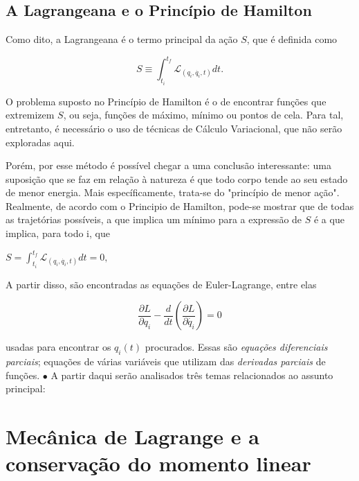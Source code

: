 \documentclass{article}
\begin{document}
\subsection{A Lagrangeana e o Princípio de Hamilton}

Como dito, a Lagrangeana é o termo principal da ação $S$, que é definida como

\begin{equation}
    S \equiv \int_{t_i}^{t_f}  \mathcal{L}_{(q_i,\dot{q_i},t)} dt .
\end{equation}

O problema suposto no Princípio de Hamilton é o de encontrar funções que extremizem $S$, ou seja, funções de máximo, mínimo ou pontos de cela. Para tal, entretanto, é necessário o uso de técnicas de Cálculo Variacional, que não serão exploradas aqui.

Porém, por esse método é possível chegar a uma conclusão interessante: uma suposição que se faz em relação à natureza é que todo corpo tende ao seu estado de menor energia. Mais específicamente, trata-se do "princípio de menor ação". Realmente, de acordo com o Principio de Hamilton, pode-se mostrar que de todas as trajetórias possíveis, a que implica um mínimo para a expressão de $S$ é a que implica, para todo i, que \newline

$
S=\int_{t_i}^{t_f}  \mathcal{L}_{(q_i,\dot{q_i},t)} dt = 0 ,
$\newline

A partir disso, são encontradas as equações de Euler-Lagrange, entre elas\newline

\begin{equation}
    \frac{\partial L}{\partial q_i} - \frac{d}{dt}(\frac{\partial L}{\partial \dot{q_i}
    })=0
\end{equation}

usadas para encontrar os $q_i(t)$ procurados. Essas são \textit{equações diferenciais parciais}; equações de várias variáveis que utilizam das \textit{derivadas parciais} de funções.\newline
\newline
$\bullet$ A partir daqui serão analisados três temas relacionados ao assunto principal:

\section{Mecânica de Lagrange e a conservação do momento linear}
\end{document}
